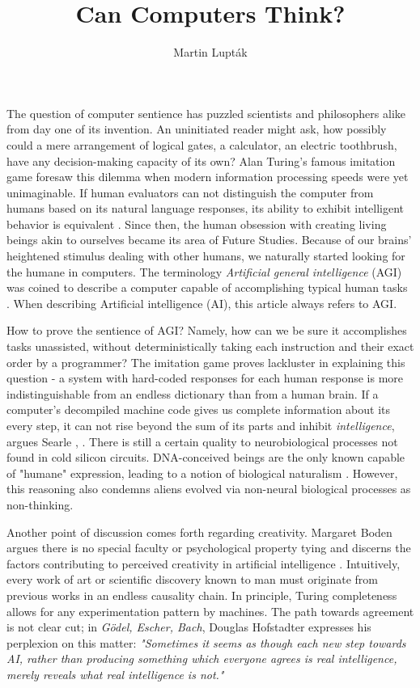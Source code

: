 \documentclass[12pt]{olplainarticle}
\title{Can Computers Think?}
\author{Martin Lupták}
\begin{document}
\flushbottom
\maketitle
\thispagestyle{empty}

The question of computer sentience has puzzled scientists and philosophers alike from day one of its invention. An uninitiated reader might ask, how possibly could a mere arrangement of logical gates, a calculator, an electric toothbrush, have any decision-making capacity of its own?
Alan Turing's famous imitation game foresaw this dilemma when modern information processing speeds were yet unimaginable. If human evaluators can not distinguish the computer from humans based on its natural language responses, its ability to exhibit intelligent behavior is equivalent \cite{machinery1950computing}. Since then, the human obsession with creating living beings akin to ourselves became its area of Future Studies. Because of our brains' heightened stimulus dealing with other humans, we naturally started looking for the humane in computers. The terminology \textit{Artificial general intelligence} (AGI) was coined to describe a computer capable of accomplishing typical human tasks \cite{wang2007introduction}. When describing Artificial intelligence (AI), this article always refers to AGI.

How to prove the sentience of AGI? Namely, how can we be sure it accomplishes tasks unassisted, without deterministically taking each instruction and their exact order by a programmer? The imitation game proves lackluster in explaining this question - a system with hard-coded responses for each human response is more indistinguishable from an endless dictionary than from a human brain. If a computer's decompiled machine code gives us complete information about its every step, it can not rise beyond the sum of its parts and inhibit \emph{intelligence}, argues Searle \cite{searle1980minds}, \cite{goertzel2007artificial}. There is still a certain quality to neurobiological processes not found in cold silicon circuits. DNA-conceived beings are the only known capable of "humane" expression, leading to a notion of biological naturalism \cite{searle2002not}. However, this reasoning also condemns aliens evolved via non-neural biological processes as non-thinking.

Another point of discussion comes forth regarding creativity. Margaret Boden argues there is no special faculty or psychological property tying and discerns the factors contributing to perceived creativity in artificial intelligence \cite{boden1996creativity}. Intuitively, every work of art or scientific discovery known to man must originate from previous works in an endless causality chain. In principle, Turing completeness allows for any experimentation pattern by machines. The path towards agreement is not clear cut; in \textit{Gödel, Escher, Bach}, Douglas Hofstadter expresses his perplexion on this matter: \textit{"Sometimes it seems as though each new step towards AI, rather than producing something which everyone agrees is real intelligence, merely reveals what real intelligence is not."} \cite{hofstadter1979godel}
\end{document}
